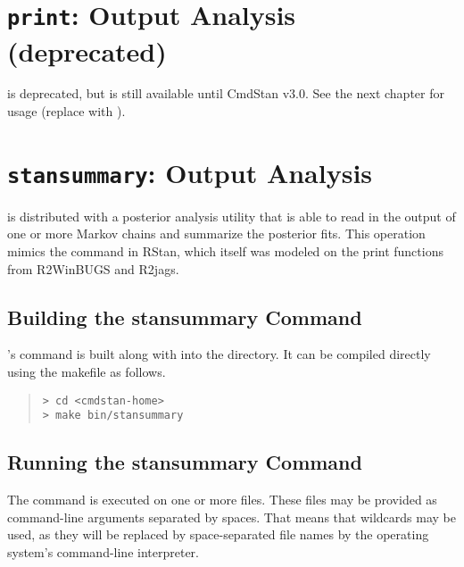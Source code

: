\chapter{{\tt\bfseries print}: Output Analysis (deprecated)}\label{print.chapter}

\noindent
{} is deprecated, but is still available until CmdStan v3.0.
See the next chapter for usage (replace  with
).

\chapter{{\tt\bfseries stansummary}: Output Analysis}\label{stansummary.chapter}

\noindent
\CmdStan is distributed with a posterior analysis utility that is able to read in
the output of one or more Markov chains and summarize the posterior
fits.  This operation mimics the  command in RStan,
which itself was modeled on the print functions from R2WinBUGS and
R2jags.

\section{Building the stansummary Command}

\CmdStan's  command is built along with  into
the  directory. It can be compiled directly using the
makefile as follows.
%
\begin{quote}
\begin{Verbatim}[fontshape=sl]
> cd <cmdstan-home>
> make bin/stansummary
\end{Verbatim}
\end{quote}
%

\section{Running the stansummary Command}

The  command is executed on one or more 
files. These files may be provided as command-line arguments
separated by spaces.  That means that wildcards may be used, as they
will be replaced by space-separated file names by the operating
system's command-line interpreter.

